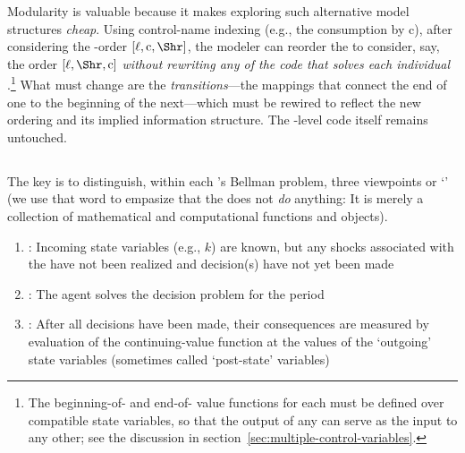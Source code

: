 \documentclass[titlepage, headings=optiontotocandhead]{econark}
\begin{document}

Modularity is valuable because it makes exploring such alternative model structures \textit{cheap}.  Using control-name indexing (e.g., the consumption {\stg} by $\mathrm{c}$), after considering the {\stg}-order $[\ell,\mathrm{c},\Shr]$, the modeler can reorder the {\stgs} to consider, say, the order $[\ell,\Shr,\mathrm{c}]$ \textit{without rewriting any of the code that solves each individual {\stg}}.\footnote{The beginning-of-{\stg} and end-of-{\stg} value functions for each {\stg} must be defined over compatible state variables, so that the output of any {\stg} can serve as the input to any other; see the discussion in section~\ref{sec:multiple-control-variables}.
}  What must change are the \textit{transitions}---the mappings that connect the end of one {\stg} to the beginning of the next---which must be rewired to reflect the new ordering and its implied information structure.  The {\stg}-level code itself remains untouched.

\hypertarget{prchs}{}
\subsection{\Prchs}\label{subsec:prchs}

The key is to distinguish, within each {\stg}'s Bellman problem, three viewpoints or `{\prchs}' (we use that word to empasize that the {\prch} does not \textit{do} anything: It is merely a collection of mathematical and computational functions and objects).
\begin{enumerate}
\item \textbf{\Arrival}: Incoming state variables (e.g., $k$) are known, but any shocks associated with the {\stg} have not been realized and decision(s) have not yet been made
\item \textbf{\Decision}: The agent solves the decision problem for the period
\item \textbf{\Continuation}: After all decisions have been made, their consequences are measured by evaluation of the continuing-value function at the values of the `outgoing' state variables (sometimes called `post-state' variables)
\end{enumerate}
\end{document}
